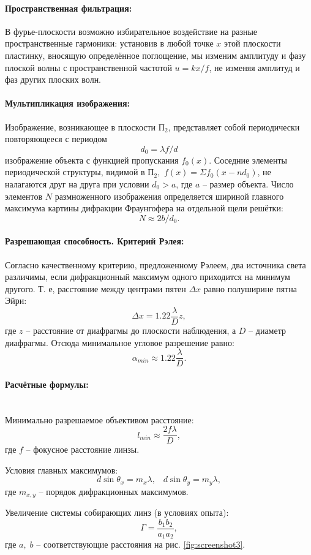 \documentclass[a4paper, 12pt]{article}
\newcommand{\parag}[1]{\paragraph*{#1:}}
\begin{document}
\parag{Пространственная фильтрация}

В фурье-плоскости возможно избирательное воздействие на разные пространственные гармоники: установив в любой точке $ x $ этой плоскости пластинку, вносящую определённое поглощение, мы изменим амплитуду и фазу плоской волны с пространственной частотой $ u = k x / f $, не изменяя амплитуд и фаз других плоских волн.

\parag{Мультипликация изображения}

Изображение, возникающее в плоскости $ П_2 $, представляет собой периодически повторяющееся с периодом $$ d_0 = \lambda f / d $$ изображение объекта с функцией пропускания $ f_0 (x) $.
Соседние элементы периодической структуры, видимой в $ П_2, $ $ f(x) = \Sigma f_0(x-n d_0) $, не налагаются друг на друга при условии $ d_0 > a $, где $ a $ -- размер объекта. Число элементов $ N $ размноженного изображения определяется шириной главного максимума картины дифракции Фраунгофера на отдельной щели решётки: $$ N\approx 2 b / d_0. $$

\parag{Разрешающая способность. Критерий Рэлея} 

Согласно качественному критерию, предложенному Рэлеем, два источника света различимы, если дифракционный максимум одного приходится на минимум другого. Т. е, расстояние между центрами пятен $ \Delta x $ равно полуширине пятна Эйри: 
\[\Delta x = 1.22 \frac{\lambda}{D} z,\] где $ z $ -- расстояние от диафрагмы до плоскости наблюдения, а $ D $ -- диаметр диафрагмы. Отсюда минимальное угловое разрешение равно: \[\alpha_{min} \approx 1.22 \frac{\lambda}{D}.\]

\parag{Расчётные формулы} ~\\

Минимально разрешаемое объективом расстояние:
\begin{equation}\label{минимальное_расстояние}
	l_{min}\approx \frac{2 f \lambda}{D},
\end{equation}
где $ f $ -- фокусное расстояние линзы.

Условия главных максимумов:
\begin{equation}\label{условие_максимумов}
	d \sin \theta_x = m_x \lambda, \;\;\;	d \sin \theta_y = m_y \lambda,
\end{equation}
где $ m_{x, y} $ -- порядок дифракционных максимумов.

Увеличение системы собирающих линз (в условиях опыта):
\begin{equation}\label{увеличение}
	\Gamma = \frac{b_1 b_2}{a_1 a_2},
\end{equation}
где $ a, \; b $ -- соответствующие расстояния на рис. \ref{fig:screenshot3}.
\end{document}
